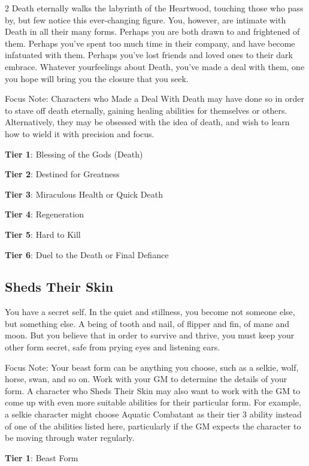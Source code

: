 \begin{multicols}{2}
Death eternally walks the labyrinth of the Heartwood, touching those who pass by, but few notice this ever-changing figure. You, however, are intimate with Death in all their many forms. Perhaps you are both drawn to and frightened of them. Perhaps you’ve spent too much time in their company, and have become infatuated with them. Perhaps you’ve lost friends and loved ones to their dark embrace. Whatever yourfeelings about Death, you’ve made a deal with them, one you hope will bring you the closure that you seek.

Focus Note: Characters who Made a Deal With Death may have done so in order to stave off death eternally, gaining healing abilities for themselves or others. Alternatively, they may be obsessed with  the idea of death, and wish to learn how to wield it with precision and focus.

\textbf{Tier 1}: Blessing of the Gods (Death)

\textbf{Tier 2}: Destined for Greatness

\textbf{Tier 3}: Miraculous Health or Quick Death

\textbf{Tier 4}: Regeneration

\textbf{Tier 5}: Hard to Kill

\textbf{Tier 6}: Duel to the Death or Final Defiance

\subsection{Sheds Their Skin}

You have a secret self. In the quiet and stillness, you become not someone else, but something else. A being of tooth and nail, of flipper and fin, of mane and moon. But you believe that in order to survive and thrive, you must keep your other form secret, safe from prying eyes and listening ears.

Focus Note: Your beast form can be anything you choose, such as a selkie, wolf, horse, swan, and so on. Work with your GM to determine the details of your form. A character who Sheds Their Skin may also want to work with the GM to come up with even more suitable abilities for their particular form. For example, a selkie character might choose Aquatic Combatant as their tier 3 ability instead of one of the abilities listed here, particularly if the GM expects the character to be moving through water regularly.

\textbf{Tier 1}: Beast Form


\end{multicols}
